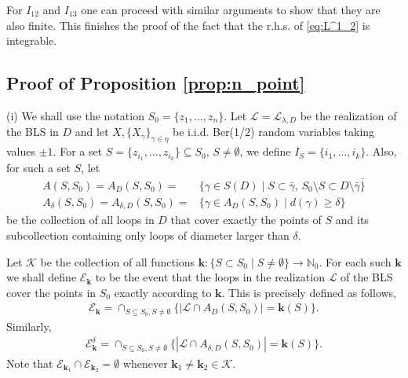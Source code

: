 \documentclass[a4paper, 11pt, reqno]{amsart}
\theoremstyle{definition} \newtheorem{defn}{Definition}[section]
\theoremstyle{remark} \newtheorem{rem}[defn]{Remark}
\theoremstyle{remark} \newtheorem*{rem*}{Remark}
\theoremstyle{plain} \newtheorem{thm}[defn]{Theorem}
\theoremstyle{plain} \newtheorem{lem}[defn]{Lemma}
\theoremstyle{plain} \newtheorem{prop}[defn]{Proposition}
\theoremstyle{plain} \newtheorem{cor}[defn]{Corollary}
\theoremstyle{remark} \newtheorem{exm}[defn]{\textbf{Example}}
\theoremstyle{remark} \newtheorem{exms}[defn]{\textbf{Examples}}
\theoremstyle{remark} \newtheorem*{bl}{}
\numberwithin{equation}{section} %
\newcommand{\mc}{\mathcal}
\newcommand{\N}{\mathbb{N}}
\begin{document}
		For $I_{12}$ and $I_{13}$ one can proceed with similar arguments to show that they are also finite. This finishes the proof of the fact that the r.h.s. of \eqref{eq:L^1_2} is integrable. 
        

    \subsection{Proof of Proposition \ref{prop:n_point}} \label{app:proof_prop:n_point}
		
		 (i) We shall use the notation $S_0 = \{ z_1, \ldots, z_n\}$. Let $\mc{L} = \mc{L}_{\lambda, D}$ be the realization of the BLS in $D$ and let $X, \{   X_{\gamma}\}_{\gamma \in \eta}$ be i.i.d. Ber(1/2) random variables taking values $\pm 1$. For a set $S = \{ z_{i_1}, \ldots, z_{i_k}\} \subseteq S_0$, $S \neq \emptyset$, we define $I_S = \{ i_1, \ldots, i_k\}$. Also, for such a set $S$, let 
		\begin{align}\label{eq:conv_n_pt_0.1}
			A(S, S_0) = A_D(S, S_0) = & \{ \gamma \in S(D) \mid S \subset \bar{\gamma}, \, S_0\setminus S \subset D \setminus \bar{\gamma} \bar\}
			\nonumber \\
			A_{\delta}(S, S_0) = A_{\delta, D}(S, S_0) = & \{ \gamma \in A_D(S, S_0) \mid d(\gamma) \ge \delta\}
		\end{align}
		be the collection of all loops in $D$ that cover exactly the points of $S$ and its subcollection containing only loops of diameter larger than $\delta$.
		
		Let $\mc{K}$ be the collection of all functions $\bm{k}: \{ S \subset S_0\mid S\neq \emptyset\} \to \N_0$. For each such $\bm{k}$ we shall define $\mc{E}_{\bm{k}}$ to be the event that the loops in the realization $\mc{L}$ of the BLS cover the points in $S_0$ exactly according to $\bm{k}$. This is precisely defined as follows, 
		\begin{align}
			\mc{E}_{\bm{k}} = \cap_{S \subseteq S_0, S \neq \emptyset}\{  | \mc{L} \cap A_D(S, S_0)| = \bm{k}(S) \}.
		\end{align}
		Similarly, 
		\begin{align}
			\mc{E}^{\delta}_{\bm{k}} = \cap_{S \subseteq S_0, S \neq \emptyset}\{   | \mc{L} \cap A_{\delta, D}(S, S_0)| = \bm{k}(S) \}.
		\end{align}
		Note that $\mc{E}_{\bm{k}_1} \cap \mc{E}_{\bm{k}_2} = \emptyset$ whenever $\bm{k}_1 \neq \bm{k}_2 \in \mc{K}$. 
		
\end{document}

